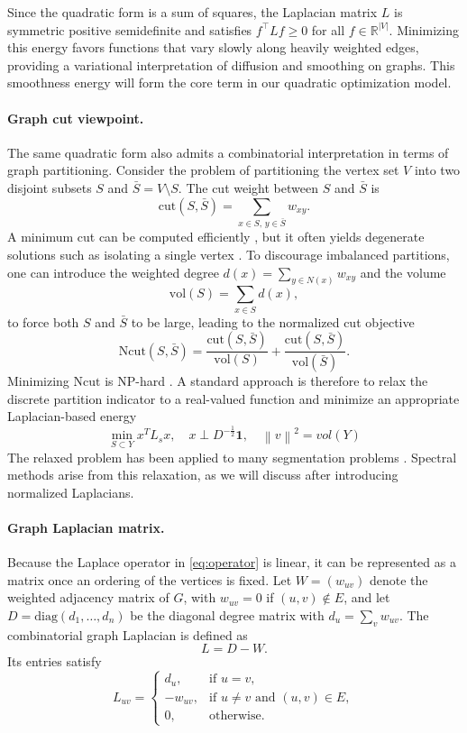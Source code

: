 \documentclass[11pt]{article}
\newcommand{\norm}[1]{\left\lVert#1\right\rVert}
\begin{document}
Since the quadratic form is a sum of squares, the Laplacian matrix $L$ is symmetric positive semidefinite and satisfies $f^\top L f \ge 0$ for all $f \in \mathbb{R}^{|V|}$. Minimizing this energy favors functions that vary slowly along heavily weighted edges, providing a variational interpretation of diffusion and smoothing on graphs. This smoothness energy will form the core term in our quadratic optimization model.

\paragraph{Graph cut viewpoint.}
The same quadratic form also admits a combinatorial interpretation in terms of graph partitioning. Consider the problem of partitioning the vertex set $V$ into two disjoint subsets $S$ and $\bar{S}=V\setminus S$. The cut weight between $S$ and $\bar{S}$ is
\[
\mathrm{cut}(S,\bar{S}) = \sum_{x \in S,\, y \in \bar{S}} w_{xy}.
\]
A minimum cut can be computed efficiently \cite{stoer1997simple,karger2000minimum}, but it often yields degenerate solutions such as isolating a single vertex \cite{mezuman2012globally}. To discourage imbalanced partitions, one can introduce the weighted degree $d(x)=\sum\limits_{y \in N(x)} w_{xy}$ and the volume
\[
\mathrm{vol}(S) = \sum_{x \in S} d(x),
\]
to force both $S$ and $\bar{S}$ to be large, leading to the normalized cut objective
\[
\mathrm{Ncut}(S,\bar{S}) 
= \frac{\mathrm{cut}(S,\bar{S})}{\mathrm{vol}(S)} 
+ \frac{\mathrm{cut}(S,\bar{S})}{\mathrm{vol}(\bar{S})}.
\]
Minimizing $\mathrm{Ncut}$ is NP-hard \cite{wagner1993between}. A standard approach is therefore to relax the discrete partition indicator to a real-valued function and minimize an appropriate Laplacian-based energy
\begin{equation}
    \min\limits_{S \subset Y} x^TL_sx, \quad x \perp D^{-\frac{1}{2}}\mathbf{1}, \quad \norm{v}^2 = vol(Y)
\end{equation}
 The relaxed problem has been applied to many segmentation problems \cite{shi2000normalized}. Spectral methods arise from this relaxation, as we will discuss after introducing normalized Laplacians. 

\paragraph{Graph Laplacian matrix.}
Because the Laplace operator in \eqref{eq:operator} is linear, it can be represented as a matrix once an ordering of the vertices is fixed. Let $W=(w_{uv})$ denote the weighted adjacency matrix of $G$, with $w_{uv}=0$ if $(u,v)\notin E$, and let $D=\mathrm{diag}(d_1,\dots,d_n)$ be the diagonal degree matrix with $d_u=\sum_v w_{uv}$. The combinatorial graph Laplacian is defined as
\[
L = D - W.
\]
Its entries satisfy
\[
L_{uv} =
\begin{cases}
d_u, & \text{if } u=v, \\
-w_{uv}, & \text{if } u \neq v \text{ and } (u,v)\in E, \\
0, & \text{otherwise.}
\end{cases}
\]
\end{document}
